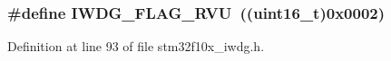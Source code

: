 \subsubsection[{\texorpdfstring{I\+W\+D\+G\+\_\+\+F\+L\+A\+G\+\_\+\+R\+VU}{IWDG_FLAG_RVU}}]{\setlength{\rightskip}{0pt plus 5cm}\#define I\+W\+D\+G\+\_\+\+F\+L\+A\+G\+\_\+\+R\+VU~(({\bf uint16\+\_\+t})0x0002)}\hypertarget{group___i_w_d_g___flag_ga3731bf2711c234ffe5b405fb6634ebca}{}\label{group___i_w_d_g___flag_ga3731bf2711c234ffe5b405fb6634ebca}


Definition at line 93 of file stm32f10x\+\_\+iwdg.\+h.

